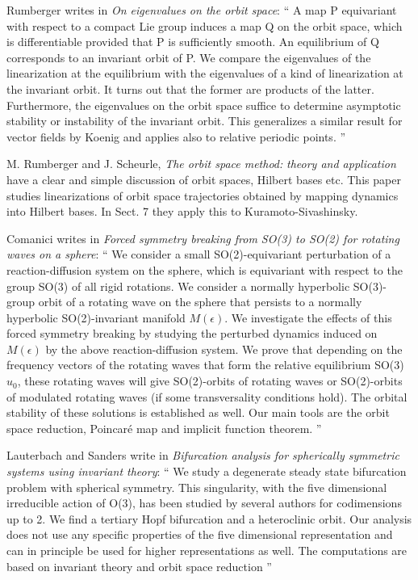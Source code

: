 \begin{description}
Rumberger writes in
\emph{On eigenvalues on the orbit space}: ``
A map P equivariant with respect to a compact Lie group induces a map Q
on the orbit space, which is differentiable provided that P is
sufficiently smooth. An equilibrium of Q corresponds to an invariant
orbit of P. We compare the eigenvalues of the linearization at the
equilibrium with the eigenvalues of a kind of linearization at the
invariant orbit. It turns out that the former are products of the latter.
Furthermore, the eigenvalues on the orbit space suffice to determine
asymptotic stability or instability of the invariant orbit. This
generalizes a similar result for vector fields by Koenig
and applies also to relative periodic points.
''

M. Rumberger and J. Scheurle,
{\emph{The orbit space method:}}
\emph{theory and application}
have a clear and simple discussion of orbit spaces,
Hilbert bases etc. This paper studies linearizations of orbit space
trajectories obtained by mapping dynamics into Hilbert bases.
In Sect. 7 they apply this to Kuramoto-Sivashinsky.

Comanici writes in \emph{Forced symmetry breaking from SO(3) to SO(2) for rotating
            waves on a sphere}: ``
We consider a small SO(2)-equivariant perturbation of a
reaction-diffusion system on the sphere, which is equivariant with
respect to the group SO(3) of all rigid rotations. We consider a normally
hyperbolic SO(3)-group orbit of a rotating wave on the sphere that
persists to a normally hyperbolic SO(2)-invariant manifold $M(\epsilon)$.
We investigate the effects of this forced symmetry breaking by studying
the perturbed dynamics induced on $M(\epsilon)$ by the above
reaction-diffusion system. We prove that depending on the frequency
vectors of the rotating waves that form the relative equilibrium
SO(3) $u_{0}$, these rotating waves will give SO(2)-orbits of rotating waves
or SO(2)-orbits of modulated rotating waves (if some transversality
conditions hold). The orbital stability of these solutions is established
as well. Our main tools are the orbit space reduction, Poincar\'e map and
implicit function theorem.
''

Lauterbach and Sanders write in \emph{Bifurcation analysis for
spherically symmetric systems using invariant theory}: ``
We study a degenerate steady state bifurcation problem with spherical
symmetry. This singularity, with the five dimensional irreducible action
of O(3), has been studied by several authors for codimensions up to 2.
We find a tertiary Hopf bifurcation and a
heteroclinic orbit. Our analysis does not use any specific properties of
the five dimensional representation and can in principle be used for
higher representations as well. The computations are based on invariant
theory and orbit space reduction
''


\end{description}
